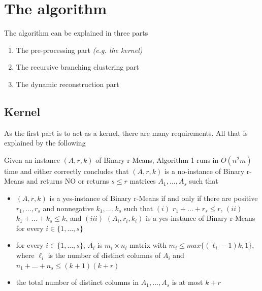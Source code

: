 \documentclass{beamer}
\begin{document}
\section{The algorithm}
\begin{frame}
  The algorithm can be explained in three parts
  \begin{enumerate}
    \item<1-> The pre-processing part \textit{(e.g. the kernel)}
    \item<2-> The recursive branching clustering part
    \item<3-> The dynamic reconstruction part
  \end{enumerate}
\end{frame}

\subsection{Kernel}
\begin{frame}
  As the first part is to act as a kernel, there are many requirements. All that is
  explained by the following

  \pause

  \begin{theoremlemma}{\cite[Lemma 5]{fomin_golovach_panolan_2020}}
    Given an instance $(A,r,k)$ of Binary r-Means, Algorithm 1 runs in $O(n^2m)$ time
    and either correctly concludes that $(A,r,k)$ is a no-instance of Binary r-Means and
    returns NO or returns $s \leq r$ matrices $A_1, \dots, A_s$ such that

    \begin{itemize}
      \item<3-> $(A,r,k)$ is a yes-instance of Binary r-Means if and only if there are positive
      $r_1,\dots,r_s$ and nonnegative $k_1,\dots,k_s$ such that $(i)$ $r_1 + \dots + r_s \leq r$,
      $(ii)$ $k_1 + \dots + k_s \leq k$, and $(iii)$ $(A_i,r_i,k_i)$ is a yes-instance of Binary
      r-Means for every $i\in\{1,\dots,s\}$
      \item<4-> for every $i\in\{1,\dots,s\}$, $A_i$ is $m_i \times n_i$ matrix with
      $m_i \leq max\{(\ell_i - 1)k, 1\}$, where $\ell_i$ is the number of distinct columns
      of $A_i$ and $n_1 + \dots + n_s \leq (k+1)(k+r)$
      \item<5-> the total number of distinct columns in $A_1,\dots,A_s$ is at most $k+r$
    \end{itemize}
  \end{theoremlemma}
\end{frame}
\end{document}
